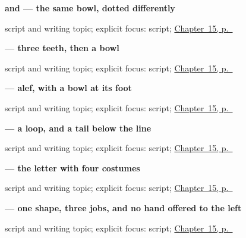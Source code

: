 \noindent\begin{minipage}[t]{\linewidth}
\raggedright
\textbf{ and  — the same bowl, dotted differently}\par
\footnotesize script and writing topic; explicit focus: script; \hyperref[ch:fa-script-nine]{Chapter~15, p.~\pageref*{ch:fa-script-nine}}
\end{minipage}\par\smallskip

\noindent\begin{minipage}[t]{\linewidth}
\raggedright
\textbf{ — three teeth, then a bowl}\par
\footnotesize script and writing topic; explicit focus: script; \hyperref[ch:fa-script-nine]{Chapter~15, p.~\pageref*{ch:fa-script-nine}}
\end{minipage}\par\smallskip

\noindent\begin{minipage}[t]{\linewidth}
\raggedright
\textbf{ — alef, with a bowl at its foot}\par
\footnotesize script and writing topic; explicit focus: script; \hyperref[ch:fa-script-nine]{Chapter~15, p.~\pageref*{ch:fa-script-nine}}
\end{minipage}\par\smallskip

\noindent\begin{minipage}[t]{\linewidth}
\raggedright
\textbf{ — a loop, and a tail below the line}\par
\footnotesize script and writing topic; explicit focus: script; \hyperref[ch:fa-script-nine]{Chapter~15, p.~\pageref*{ch:fa-script-nine}}
\end{minipage}\par\smallskip

\noindent\begin{minipage}[t]{\linewidth}
\raggedright
\textbf{ — the letter with four costumes}\par
\footnotesize script and writing topic; explicit focus: script; \hyperref[ch:fa-script-nine]{Chapter~15, p.~\pageref*{ch:fa-script-nine}}
\end{minipage}\par\smallskip

\noindent\begin{minipage}[t]{\linewidth}
\raggedright
\textbf{ — one shape, three jobs, and no hand offered to the left}\par
\footnotesize script and writing topic; explicit focus: script; \hyperref[ch:fa-script-nine]{Chapter~15, p.~\pageref*{ch:fa-script-nine}}
\end{minipage}\par\smallskip

